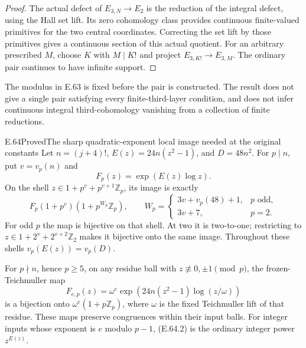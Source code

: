 \begin{proof}
The actual defect of $E_{3,N}\to E_2$
is the reduction of the integral
defect, using the Hall set lift.
Its zero cohomology class provides
continuous finite-valued primitives
for the two central coordinates.
Correcting the set lift by those
primitives gives a continuous
section of this actual quotient.
For an arbitrary prescribed $M$,
choose $K$ with $M\mid K!$ and
project $E_{3,K!}\to E_{3,M}$.
The ordinary pair continues to have
infinite support.
\end{proof}

The modulus in E.63 is fixed before
the pair is constructed. The result
does not give a single pair satisfying
every finite-third-layer condition,
and does not infer continuous integral
third-cohomology vanishing from a
collection of finite reductions.

\begin{result}{E.64}{Proved}{The sharp quadratic-exponent local image needed at the original constants}
\label{coh:sharp-quadratic-image}
Let $n=(j+4)!$, $E(z)=24n(z^2-1)$,
and $D=48n^2$. For $p\mid n$, put
$v=v_p(n)$ and
\[
 F_p(z)=\exp(E(z)\log z).
\]
On the shell
$z\in1+p^v+p^{v+1}\mathbb Z_p$,
its image is exactly
\[
 F_p(1+p^v)(1+p^{W_p}\mathbb Z_p),\qquad
 W_p=
 \begin{cases}
  3v+v_p(48)+1,&p\text{ odd},\\
  3v+7,&p=2.
 \end{cases}
 \tag{E.64.1}
\]
For odd $p$ the map is bijective on that
shell. At two it is two-to-one; restricting
to $z\in1+2^v+2^{v+2}\mathbb Z_2$
makes it bijective onto the same image.
Throughout these shells
$v_p(E(z))=v_p(D)$.

For $p\nmid n$, hence $p\geq5$, on any
residue ball with $z\not\equiv0,\pm1\pmod p$,
the frozen-Teichmuller map
\[
 F_{e,p}(z)=\omega^e
       \exp(24n(z^2-1)\log(z/\omega))
 \tag{E.64.2}
\]
is a bijection onto
$\omega^e(1+p\mathbb Z_p)$, where
$\omega$ is the fixed Teichmuller lift
of that residue. These maps preserve
congruences within their input balls.
For integer inputs whose exponent is
$e$ modulo $p-1$, (E.64.2) is the
ordinary integer power $z^{E(z)}$.
\end{result}
